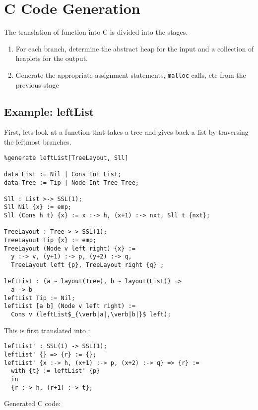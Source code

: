 \section{C Code Generation}

The translation of \PikaCore{} function into C is divided into the stages.

\begin{enumerate}
  \item \label{stage:in-out} For each branch, determine the abstract heap for the input and a collection of
    heaplets for the output.
  \item Generate the appropriate assignment statements, \verb|malloc| calls, etc from the
    previous stage
\end{enumerate}

\subsection{Example: leftList}
First, lets look at a \Pika{} function that takes a tree and gives back a list by traversing the leftmost branches.

\begin{lstlisting}
%generate leftList[TreeLayout, Sll]

data List := Nil | Cons Int List;
data Tree := Tip | Node Int Tree Tree;

Sll : List >-> SSL(1);
Sll Nil {x} := emp;
Sll (Cons h t) {x} := x :-> h, (x+1) :-> nxt, Sll t {nxt};

TreeLayout : Tree >-> SSL(1);
TreeLayout Tip {x} := emp;
TreeLayout (Node v left right) {x} :=
  y :-> v, (y+1) :-> p, (y+2) :-> q,
  TreeLayout left {p}, TreeLayout right {q} ;

leftList : (a ~ layout(Tree), b ~ layout(List)) =>
  a -> b
leftList Tip := Nil;
leftList [a b] (Node v left right) :=
  Cons v (leftList$_{\verb|a|,\verb|b|}$ left);
\end{lstlisting}

\noindent
This is first translated into \PikaCore:

\begin{lstlisting}
leftList' : SSL(1) -> SSL(1);
leftList' {} => {r} := {};
leftList' {x :-> h, (x+1) :-> p, (x+2) :-> q} => {r} :=
  with {t} := leftList' {p}
  in
  {r :-> h, (r+1) :-> t};
\end{lstlisting}

\noindent
Generated C code:

